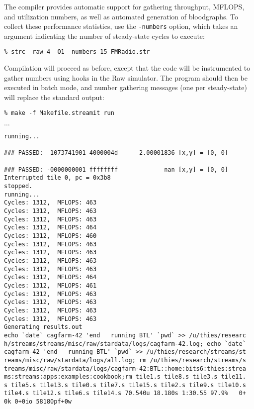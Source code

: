 

  The compiler provides automatic
support for gathering throughput, MFLOPS, and utilization numbers, as
well as automated generation of bloodgraphs.  To collect these
performance statistics, use the {\tt -numbers} option, which takes an
argument indicating the number of steady-state cycles to execute:
{\small
\begin{verbatim}
% strc -raw 4 -O1 -numbers 15 FMRadio.str
\end{verbatim}
} 
%
Compilation will proceed as before, except that the code will be
instrumented to gather numbers using hooks in the Raw simulator.  The
program should then be executed in batch mode, and number gathering
messages (one per steady-state) will replace the standard output: 
%
{\small
\begin{verbatim}
% make -f Makefile.streamit run
\end{verbatim}
$\dots$
\begin{verbatim}
running...

### PASSED:  1073741901 4000004d      2.00001836 [x,y] = [0, 0]

### PASSED: -0000000001 ffffffff             nan [x,y] = [0, 0]
Interrupted tile 0, pc = 0x3b8
stopped.
running...
Cycles: 1312,  MFLOPS: 463
Cycles: 1312,  MFLOPS: 463
Cycles: 1312,  MFLOPS: 463
Cycles: 1312,  MFLOPS: 464
Cycles: 1312,  MFLOPS: 460
Cycles: 1312,  MFLOPS: 463
Cycles: 1312,  MFLOPS: 463
Cycles: 1312,  MFLOPS: 463
Cycles: 1312,  MFLOPS: 463
Cycles: 1312,  MFLOPS: 464
Cycles: 1312,  MFLOPS: 461
Cycles: 1312,  MFLOPS: 463
Cycles: 1312,  MFLOPS: 463
Cycles: 1312,  MFLOPS: 463
Cycles: 1312,  MFLOPS: 463
Generating results.out
echo `date` cagfarm-42 'end   running BTL' `pwd` >> /u/thies/researc
h/streams/streams/misc/raw/stardata/logs/cagfarm-42.log; echo `date`
cagfarm-42 'end   running BTL' `pwd` >> /u/thies/research/streams/st
reams/misc/raw/stardata/logs/all.log; rm /u/thies/research/streams/s
treams/misc/raw/stardata/logs/cagfarm-42:BTL::home:bits6:thies:strea
ms:streams:apps:examples:cookbook;rm tile1.s tile8.s tile3.s tile11.
s tile5.s tile13.s tile0.s tile7.s tile15.s tile2.s tile9.s tile10.s
tile4.s tile12.s tile6.s tile14.s 70.540u 18.180s 1:30.55 97.9%   0+
0k 0+0io 58180pf+0w
\end{verbatim}
} 

